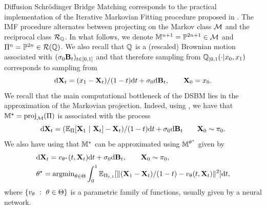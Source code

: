 \documentclass{article}
\begin{document}
Diffusion Schr\"odinger Bridge Matching corresponds to the practical implementation of the Iterative Markovian Fitting procedure proposed in \cite{shi2023DSBM,peluchetti_diffusion_2023}. The IMF procedure alternates between projecting on the Markov class $\mathcal{M}$ and
the reciprocal class $\mathcal{R}_{\mathbb{Q}}$. In what follows, we denote $\mathbb{M}^{n+1} = \mathbb{P}^{2n+1} \in \mathcal{M}$ and $\Pi^n = \mathbb{P}^{2n} \in \mathcal{R}(\mathbb{Q})$. We also recall that $\mathbb{Q}$ is a (rescaled) Brownian motion associated with $(\sigma_0 \mathbf{B}_t)_{t \in [0,1]}$ and that therefore sampling from $\mathbb{Q}_{|0,1}(\cdot | x_0, x_1)$ corresponds to sampling from
\begin{equation}
    \mathrm{d} \mathbf{X}_t = (x_1 - \mathbf{X}_t) / (1 - t) \mathrm{d} t + \sigma_0 \mathrm{d} \mathbf{B}_t , \qquad \mathbf{X}_0 = x_0 . 
\end{equation}
We recall that the main computational bottleneck of the DSBM lies in the approximation of the Markovian projection. 
Indeed, using \cite[Definition 1, Proposition 2]{shi2023DSBM}, we have that $\mathbb{M}^\star=\mathrm{proj}_{\mathcal{M}}(\Pi)$ is associated with the process
\begin{equation}
  \mathrm{d} \mathbf{X}_t = (\mathbb{E}_{\Pi}[\mathbf{X}_1 \ | \ \mathbf{X}_t] - \mathbf{X}_t) / (1 - t) \mathrm{d} t + \sigma_0 \mathrm{d} \mathbf{B}_t \qquad \mathbf{X}_0 \sim \pi_0 . 
\end{equation}
We also have using \cite[Proposition 2]{shi2023DSBM} that %
$\mathbb{M}^\star$ can be approximated using $\mathbb{M}^{\theta^\star}$ given by 
\begin{align}
&  \label{eq:approximate_markovian_proj_forward}
  \rmd \bfX_t =  v_{\theta^\star}(t, \bfX_t) \rmd t + \sigma_0 \rmd \bfB_t , \qquad \bfX_0 \sim \pi_0 , \\
  \label{eq:loss_function_theta}
 & \theta^\star = \argmin_{\theta \in \Theta} \int_0^1 \mathbb{E}_{\Pi_{t,1}}[\|(\bfX_1 - \bfX_t)/(1-t)  - v_\theta(t,\bfX_t)\|^2]\rmd t,
\end{align}
where $\{ v_\theta \ : \ \theta \in \Theta \}$ is a parametric family of
functions, usually given by a neural network. 
\end{document}
